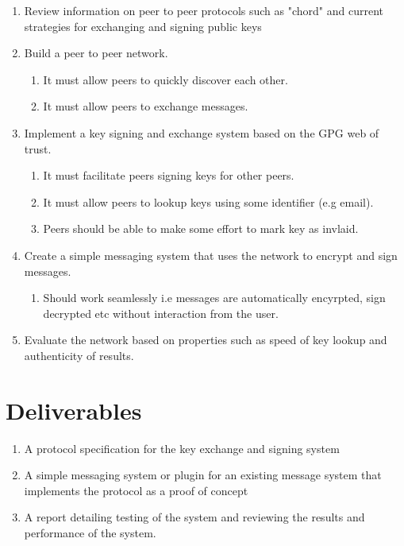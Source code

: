 \documentclass[
10pt, %
a4paper, %
oneside, %
headinclude,footinclude, %
BCOR5mm, %
]{scrartcl}
\begin{document}
\begin{enumerate}
  \item Review information on peer to peer protocols such as "chord" and current strategies for exchanging and signing public keys
  \item Build a peer to peer network.
    \begin{enumerate}
      \item It must allow peers to quickly discover each other.
      \item It must allow peers to exchange messages.
    \end{enumerate}
  \item Implement a key signing and exchange system based on the GPG web of trust.
    \begin{enumerate}
      \item It must facilitate peers signing keys for other peers.
      \item It must allow peers to lookup keys using some identifier (e.g email).
      \item Peers should be able to make some effort to mark key as invlaid.
    \end{enumerate}
  \item Create a simple messaging system that uses the network to encrypt and sign messages.
    \begin{enumerate}
      \item Should work seamlessly i.e messages are automatically encyrpted, sign decrypted etc without interaction from the user.
    \end{enumerate}
  \item Evaluate the network based on properties such as speed of key lookup and authenticity of results. 
\end{enumerate}

\section{Deliverables}
  \begin{enumerate}
    \item A protocol specification for the key exchange and signing system
    \item A simple messaging system or plugin for an existing message system that implements the protocol as a proof of concept
    \item A report detailing testing of the system and reviewing the results and performance of the system. 
  \end{enumerate}
\end{document}
